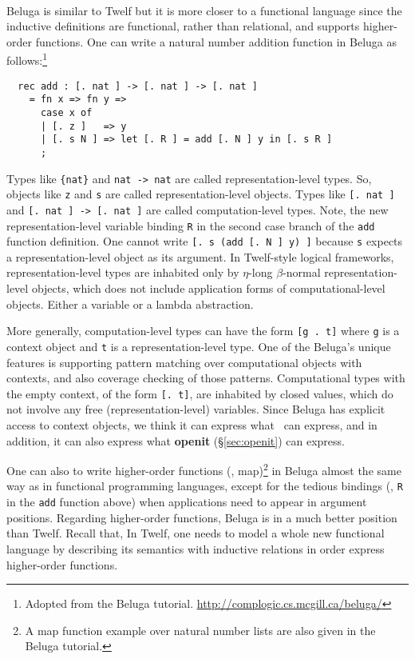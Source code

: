\paragraph{}
Beluga \cite{Pie10} is similar to Twelf but it is more closer to
a functional language since the inductive definitions are functional,
rather than relational, and supports higher-order functions.
One can write a natural number addition function in Beluga 
as follows:\footnote{
	Adopted from the Beluga tutorial.
	\url{http://complogic.cs.mcgill.ca/beluga/} }\vspace*{-2em}
\begin{singlespace}
\begin{verbatim}
  rec add : [. nat ] -> [. nat ] -> [. nat ]
    = fn x => fn y =>
      case x of
      | [. z ]   => y
      | [. s N ] => let [. R ] = add [. N ] y in [. s R ]
      ;
\end{verbatim}
\end{singlespace}\noindent
Types like \verb|{nat}| and \verb|nat -> nat| are called
representation-level types. So, objects like \verb|z| and \verb|s|
are called representation-level objects.
Types like \verb|[. nat ]| and \verb|[. nat ] -> [. nat ]| are called
computation-level types.
Note, the new representation-level variable binding \verb|R| in
the second case branch of the \verb|add| function definition.
One cannot write \verb|[. s (add [. N ] y) ]| because \verb|s|
expects a representation-level object as its argument.
In Twelf-style logical frameworks, representation-level types are
inhabited only by $\eta$-long $\beta$-normal representation-level objects,
which does not include application forms of computational-level objects.
Either a variable or a lambda abstraction.

More generally, computation-level types can have the form \verb|[g . t]|
where \verb|g| is a context object and \verb|t| is a representation-level type.
One of the Beluga's unique features is supporting pattern matching over
computational objects with contexts, and also coverage checking of those
patterns. Computational types with the empty context, of the form
\verb|[. t]|, are inhabited by closed values, which do not involve
any free (representation-level) variables.
Since Beluga has explicit access to context objects, we think
it can express what \MsfIt\ can express, and in addition, it can
also express what \textbf{openit} (\S\ref{sec:openit}) can express.

One can also to write higher-order functions (\eg, map)\footnote{
	A map function example over natural number lists are
	also given in the Beluga tutorial. }
in Beluga almost the same way as in functional programming languages, except
for the tedious bindings (\eg, \verb|R| in the \verb|add| function above)
when applications need to appear in argument positions.
Regarding higher-order functions, Beluga is in a much better position
than Twelf. Recall that, In Twelf, one needs to model a whole new
functional language by describing its semantics with inductive relations
in order express higher-order functions.

